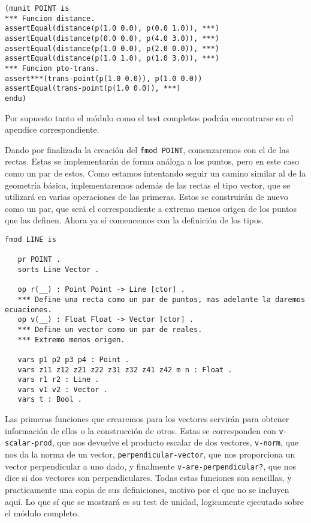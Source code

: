 {\codesize
\begin{verbatim}
(munit POINT is
*** Funcion distance.
assertEqual(distance(p(1.0 0.0), p(0.0 1.0)), ***)
assertEqual(distance(p(0.0 0.0), p(4.0 3.0)), ***)
assertEqual(distance(p(1.0 0.0), p(2.0 0.0)), ***)
assertEqual(distance(p(1.0 1.0), p(1.0 3.0)), ***)
*** Funcion pto-trans.
assert***(trans-point(p(1.0 0.0)), p(1.0 0.0))
assertEqual(trans-point(p(1.0 0.0)), ***)
endu)
\end{verbatim}
}

Por supuesto tanto el módulo como el test completos podrán encontrarse en el apendice correspondiente.\par

Dando por finalizada la creación del \texttt{fmod POINT}, comenzaremos con el de las rectas. Estas se implementarán de forma análoga a los puntos, pero en este caso como un par de estos. Como estamos intentando seguir un camino similar al de la geometría básica, inplementaremos además de las rectas el tipo vector, que se utilizará en varias operaciones de las primeras. Estos se construirán de nuevo como un par, que será el correspondiente a extremo menos origen de los puntos que las definen. Ahora ya sí comencemos con la definición de los tipos.\par 

{\codesize
\begin{verbatim}
fmod LINE is 

   pr POINT .
   sorts Line Vector .

   op r(__) : Point Point -> Line [ctor] .
   *** Define una recta como un par de puntos, mas adelante la daremos ecuaciones.
   op v(__) : Float Float -> Vector [ctor] .
   *** Define un vector como un par de reales.
   *** Extremo menos origen.

   vars p1 p2 p3 p4 : Point .
   vars z11 z12 z21 z22 z31 z32 z41 z42 m n : Float .
   vars r1 r2 : Line .
   vars v1 v2 : Vector .
   vars t : Bool .
\end{verbatim}
}

Las primeras funciones que crearemos para los vectores servirán para obtener información de ellos o la construcción de otros. Estas se corresponden con \texttt{v-scalar-prod}, que nos devuelve el producto escalar de dos vectores, \texttt{v-norm}, que nos da la norma de un vector, \texttt{perpendicular-vector}, que nos proporciona un vector perpendicular a uno dado, y finalmente \texttt{v-are-perpendicular?}, que nos dice si dos vectores son perpendiculares. Todas estas funciones son sencillas, y practicamente una copia de sus definiciones, motivo por el que no se incluyen aquí. Lo que sí que se mostrará es su test de unidad, logicamente ejecutado sobre el módulo completo.\par

